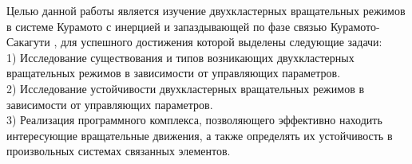 Целью данной работы является изучение двухкластерных вращательных режимов в системе Курамото
с инерцией и запаздывающей по фазе связью Курамото-Сакагути \cite{Sakaguchi}, для успешного достижения которой выделены следующие задачи: \\
1) Исследование существования и типов возникающих двухкластерных вращательных режимов в зависимости от управляющих параметров. \\
2) Исследование устойчивости двухкластерных вращательных режимов в зависимости от управляющих параметров. \\
3) Реализация программного комплекса, позволяющего эффективно находить интересующие вращательные движения, а также определять
их устойчивость в произвольных системах связанных элементов.
